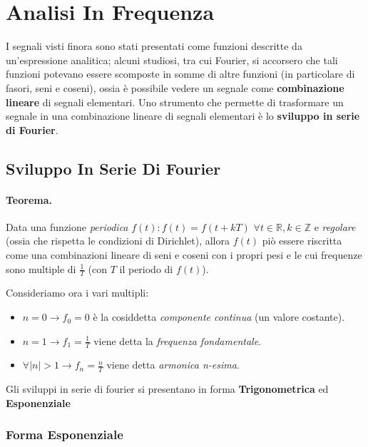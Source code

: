 

\section{Analisi In Frequenza}
I segnali visti finora sono stati presentati come funzioni descritte da un'espressione analitica; alcuni studiosi, tra cui Fourier,
si accorsero che tali funzioni potevano essere scomposte in somme di altre funzioni (in particolare di fasori, seni e coseni), ossia
è possibile vedere un segnale come \textbf{combinazione lineare} di segnali elementari. Uno strumento che permette di trasformare
un segnale in una combinazione lineare di segnali elementari è lo \textbf{sviluppo in serie di Fourier}.

\subsection{Sviluppo In Serie Di Fourier}
\begin{highlightedeq}
    \paragraph{Teorema.}Data una funzione \textit{periodica} $f(t) : f(t) = f(t + kT)$  $\forall t \in \mathbb{R}, k \in \mathbb{Z}$ e \textit{regolare}
    (ossia che rispetta le condizioni di Dirichlet), allora $f(t)$ piò essere riscritta come una combinazioni lineare di seni e 
    coseni con i propri pesi e le cui frequenze sono multiple di $\frac{1}{T}$ (con $T$ il periodo di $f(t)$).
\end{highlightedeq}

Consideriamo ora i vari multipli:
\begin{itemize}
    \item $n = 0 \longrightarrow f_0 = 0$ è la cosiddetta \textit{componente continua} (un valore costante).
    \item $n = 1 \longrightarrow f_1 = \frac{1}{T}$ viene detta la \textit{frequenza fondamentale}.
    \item $\forall |n| > 1 \longrightarrow f_n = \frac{n}{T}$ viene detta \textit{armonica n-esima}.
\end{itemize}

Gli sviluppi in serie di fourier si presentano in forma \textbf{Trigonometrica} ed \textbf{Esponenziale}

\subsubsection{Forma Esponenziale}
